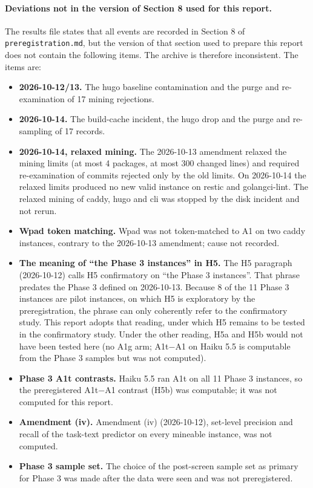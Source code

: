\paragraph{Deviations not in the version of Section 8 used for this report.} The results file states that all events are recorded in Section 8 of \texttt{preregistration.md}, but the version of that section used to prepare this report does not contain the following items. The archive is therefore inconsistent. The items are:
\begin{itemize}
\item \textbf{2026-10-12/13.} The hugo baseline contamination and the purge and re-examination of 17 mining rejections.
\item \textbf{2026-10-14.} The build-cache incident, the hugo drop and the purge and re-sampling of 17 records.
\item \textbf{2026-10-14, relaxed mining.} The 2026-10-13 amendment relaxed the mining limits (at most 4 packages, at most 300 changed lines) and required re-examination of commits rejected only by the old limits. On 2026-10-14 the relaxed limits produced no new valid instance on restic and golangci-lint. The relaxed mining of caddy, hugo and cli was stopped by the disk incident and not rerun.
\item \textbf{Wpad token matching.} Wpad was not token-matched to A1 on two caddy instances, contrary to the 2026-10-13 amendment; cause not recorded.
\item \textbf{The meaning of ``the Phase 3 instances'' in H5.} The H5 paragraph (2026-10-12) calls H5 confirmatory on ``the Phase 3 instances''. That phrase predates the Phase 3 defined on 2026-10-13. Because 8 of the 11 Phase 3 instances are pilot instances, on which H5 is exploratory by the preregistration, the phrase can only coherently refer to the confirmatory study. This report adopts that reading, under which H5 remains to be tested in the confirmatory study. Under the other reading, H5a and H5b would not have been tested here (no A1g arm; A1t$-$A1 on Haiku 5.5 is computable from the Phase 3 samples but was not computed).
\item \textbf{Phase 3 A1t contrasts.} Haiku 5.5 ran A1t on all 11 Phase 3 instances, so the preregistered A1t$-$A1 contrast (H5b) was computable; it was not computed for this report.
\item \textbf{Amendment (iv).} Amendment (iv) (2026-10-12), set-level precision and recall of the task-text predictor on every mineable instance, was not computed.
\item \textbf{Phase 3 sample set.} The choice of the post-screen sample set as primary for Phase 3 was made after the data were seen and was not preregistered.

\end{itemize}
